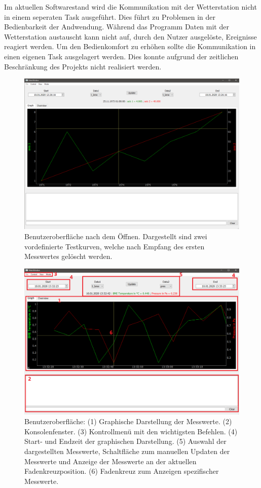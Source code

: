 Im aktuellen Softwarestand wird die Kommunikation mit der Wetterstation nicht in einem seperaten Task ausgeführt. Dies führt zu Problemen in der Bedienbarkeit der Andwendung. Während das Programm Daten mit der Wetterstation austauscht kann nicht auf, durch den Nutzer ausgelöste, Ereignisse reagiert werden. Um den Bedienkomfort zu erhöhen sollte die Kommunikation in einen eigenen Task ausgelagert werden. Dies konnte aufgrund der zeitlichen Beschränkung des Projekts nicht realisiert werden.
\begin{figure}[H]
  \centering
  \includegraphics[width=\textwidth]{./img/ui_open}
  \caption{Benutzeroberfläche nach dem Öffnen. Dargestellt sind zwei vordefinierte Testkurven, welche nach Empfang des ersten Messwertes gelöscht werden.}\label{fig:ui_open}
\end{figure}
\begin{figure}[H]
  \centering
  \includegraphics[width=\textwidth]{./img/ui_simulated_graph}
  \caption{Benutzeroberfläche: (1) Graphische Darstellung der Messwerte. (2) Konsolenfenster. (3) Kontrollmenü mit den wichtigsten Befehlen. (4) Start- und Endzeit der graphischen Darstellung. (5) Auswahl der dargestellten Messwerte, Schaltfläche zum manuellen Updaten der Messwerte und Anzeige der Messwerte an der aktuellen Fadenkreuzposition. (6) Fadenkreuz zum Anzeigen spezifischer Messwerte.}\label{fig:ui_graph}
\end{figure}
